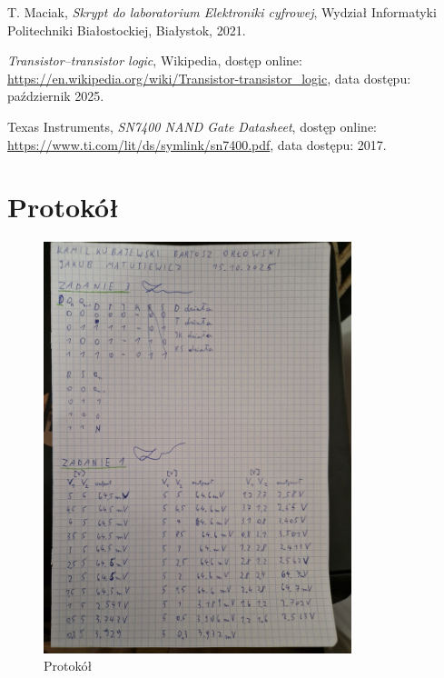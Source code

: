 \documentclass{article}
\begin{document}
\renewcommand{\refname}{}

\begin{thebibliography}{9}
	
	T. Maciak, \textit{Skrypt do laboratorium Elektroniki cyfrowej}, 
	Wydział Informatyki Politechniki Białostockiej, Białystok, 2021.
	
	\textit{Transistor–transistor logic}, Wikipedia, dostęp online: 
	\url{https://en.wikipedia.org/wiki/Transistor-transistor_logic}, 
	data dostępu: październik 2025.
	
	Texas Instruments, \textit{SN7400 NAND Gate Datasheet}, dostęp online: 
	\url{https://www.ti.com/lit/ds/symlink/sn7400.pdf}, 
	data dostępu: 2017.
	
\end{thebibliography}

\pagebreak
\section{Protokół}

\begin{figure}[h]
    \centering
    \includegraphics[width=0.8\textwidth, angle=-90]{protokol.JPG}
    \caption{Protokół}
    \label{fig:moj_obrazek}
\end{figure}
\end{document}
